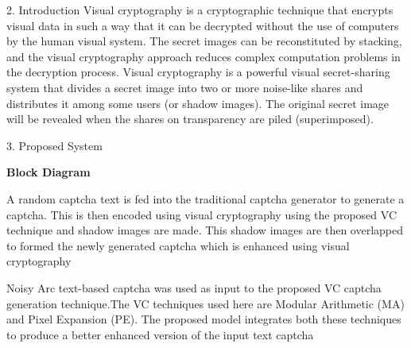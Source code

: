 \documentclass[
    landscape,      %
    paperwidth = 1120mm,
    paperheight = 950mm,
    fontscale = 0.30,
    margin = 1.7cm,
]{baposter}
\begin{document}
\begin{poster}
\begin{posterbox}[column=0, below=auto]{2. Introduction}
\setlength{\parskip}{3pt}
Visual cryptography is a cryptographic technique that encrypts visual data in such a way that it can be decrypted without the use of computers by the human visual system. The secret images can be reconstituted by stacking, and the visual cryptography approach reduces complex computation problems in the decryption process. Visual cryptography is a powerful visual secret-sharing system that divides a secret image into two or more noise-like shares and distributes it among some users (or shadow images). The original secret image will be revealed when the shares on transparency are piled (superimposed).

\end{posterbox}

\begin{posterbox}[column=0, below=auto]{3. Proposed System}

\begin{center}
\textbf{Block Diagram}
\end{center}
A random captcha text is fed into the traditional captcha generator to generate a captcha. This is then encoded using visual cryptography using the proposed VC technique and shadow images are made. This shadow images are then overlapped to formed the newly generated captcha which is enhanced using visual cryptography
\end{posterbox}


\begin{posterbox}[column=1]{}

Noisy Arc text-based captcha was used as input to the proposed VC captcha generation technique.The VC techniques used here are Modular Arithmetic (MA) and Pixel Expansion (PE). The proposed model integrates both these techniques to produce a better enhanced version of the input text captcha




\end{posterbox}
\end{poster}
\end{document}
